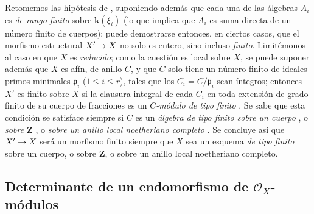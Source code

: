 \documentclass[oneside,10pt]{amsart}
\makeatletter
\renewcommand{\leq}{\leqslant}
\newcommand{\ega@arrow}[2]{\mathchoice{#1}{#2}{#2}{#2}}
\renewcommand{\to}{\ega@arrow{\longrightarrow}{\rightarrow}}
\let\EGAOriginalLabel\label
\renewcommand{\label}[1]{\phantomsection\EGAOriginalLabel{#1}}
\makeatother
\begin{document}
\begin{remark}[6.3.10]
\label{II.6.3.10-fr}
Retomemos las hipótesis de , suponiendo además que cada una de las álgebras $A_i$ es \emph{de rango finito} sobre $\boldsymbol{k}(\xi_i)$ (lo que implica que $A_i$ es suma directa de un número finito de cuerpos);
puede demostrarse entonces, en ciertos casos, que el morfismo estructural $X'\to X$ no solo es entero, sino incluso \emph{finito}.
Limitémonos al caso en que $X$ es \emph{reducido};
como la cuestión es local sobre $X$, se puede suponer además que $X$ es afín, de anillo $C$, y que $C$ solo tiene un número finito de ideales primos minimales $\mathfrak{p}_i$ ($1\leq i\leq r$), tales que los $C_i=C/\mathfrak{p}_i$ sean íntegros;
entonces $X'$ es finito sobre $X$ si la clausura integral de cada $C_i$ en toda extensión de grado finito de su cuerpo de fracciones es un \emph{$C$-módulo de tipo finito} .
Se sabe que esta condición se satisface siempre si $C$ es un \emph{álgebra de tipo finito sobre un cuerpo} \cite[t.~I, p.~267, th.~9]{I-13}, o \emph{sobre $\mathbf{Z}$} \cite[I,p.~93, th.~3]{I-9}, o \emph{sobre un anillo local noetheriano completo} \cite[p.~298]{II-25}.
Se concluye así que $X'\to X$ será un morfismo finito siempre que $X$ sea un esquema \emph{de tipo finito} sobre un cuerpo, o sobre $\mathbf{Z}$, o sobre un anillo local noetheriano completo.
\end{remark}

\subsection{Determinante de un endomorfismo de $\mathcal{O}_X$-módulos}
\label{subsection:II.6.4-fr}
\end{document}
